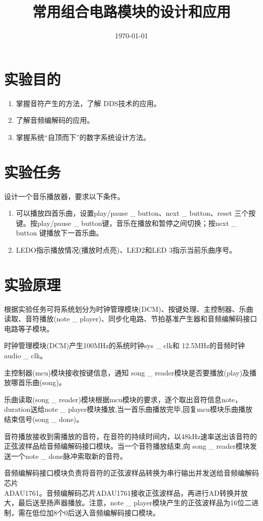\documentclass{../source/Experiment}
\title{常用组合电路模块的设计和应用}
\date{\today}
\begin{document}
    \makecover

    \section{实验目的}
        \begin{enumerate}
            \item 掌握音符产生的方法，了解 DDS技术的应用。
            \item 了解音频编解码的应用。
            \item 掌握系统“自顶而下”的数字系统设计方法。
        \end{enumerate}
    \section{实验任务}
        设计一个音乐播放器，要求以下条件。
        \begin{enumerate}
            \item 可以播放四首乐曲，设置play/pause \_ button、next \_ button、reset 三个按键。按play/pause \_ button键，音乐在播放和暂停之间切换；按next \_ button 键播放下一首乐曲。
            \item LEDO指示播放情况(播放时点亮)、LED2和LED 3指示当前乐曲序号。
        \end{enumerate}
    \section{实验原理}

        根据实验任务可将系统划分为时钟管理模块(DCM)、按键处理、主控制器、乐曲读取、音符播放(note \_ player)、同步化电路、节拍基准产生器和音频编解码接口电路等子模块。
        
        时钟管理模块(DCM)产生100MHz的系统时钟sys \_ clk和 12.5MHz的音频时钟audio \_ clk。
        
        主控制器(mcu)模块接收按键信息，通知 song \_ reader模块是否要播放(play)及播放哪首乐曲(song)。
        
        乐曲读取(song \_ reader)模块根据mcu模块的要求，逐个取出音符信息{note，duration}送给note \_ player模块播放,当一首乐曲播放完毕,回复mcu模块乐曲播放结束信号(song \_ done)。

        音符播放接收到需播放的音符，在音符的持续时间内，以48kHz速率送出该音符的正弦波样品给音频编解码接口模块。当一个音符播放结束,向 song \_ reader模块发送一个note \_ done脉冲索取新的音符。

        音频编解码接口模块负责将音符的正弦波样品转换为串行输出并发送给音频编解码芯片 \\ ADAU1761。音频编解码芯片ADAU1761接收正弦波样品，再进行AD转换并放大，最后送至扬声器播放。注意，note \_ player模块产生的正弦波样品为16位二进制，需在低位加8个0后送入音频编解码接口模块。
\end{document}

